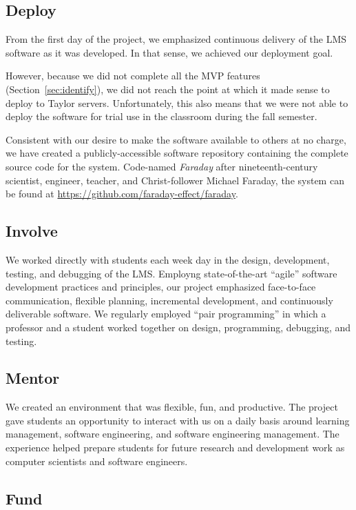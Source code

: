 \documentclass{article}
\begin{document}
\subsection{Deploy}

From the first day of the project,
we emphasized continuous delivery
of the LMS software as it was developed.
In that sense,
we achieved our deployment goal.

However,
because we did not complete all the MVP features
(Section~\ref{sec:identify}),
we did not reach the point at which
it made sense to deploy to Taylor servers.
Unfortunately,
this also means that we were not able to
deploy the software for trial use in the classroom
during the fall semester.

Consistent with our desire to make the software
available to others at no charge,
we have created a publicly-accessible software repository
containing the complete source code
for the system.
Code-named \emph{Faraday} after nineteenth-century
scientist, engineer, teacher, and Christ-follower Michael Faraday,
the system can be found at \url{https://github.com/faraday-effect/faraday}.

\subsection{Involve}

We worked directly with students
each week day
in the design, development, testing, and debugging
of the LMS.
Employng state-of-the-art
``agile'' software development
practices and principles,
our project emphasized
face-to-face communication,
flexible planning,
incremental development,
and continuously deliverable software.
We regularly employed ``pair programming''
in which a professor and a student
worked together on design, programming,
debugging, and testing.

\subsection{Mentor}

We created an environment that was
flexible, fun, and productive.
The project gave students an opportunity to interact
with us on a daily basis around
learning management,
software engineering,
and software engineering management.
The experience
helped prepare students
for future research and development work
as computer scientists and software engineers.

\subsection{Fund}
\end{document}
